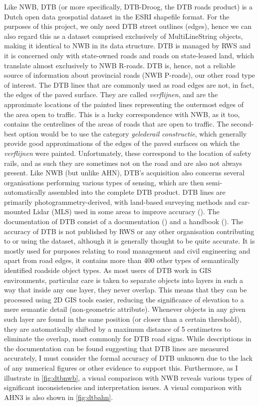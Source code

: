 Like NWB, DTB (or more specifically, DTB-Droog, the DTB roads product) is a Dutch open data geospatial dataset in the ESRI shapefile format. For the purposes of this project, we only need DTB street outlines (edges), hence we can also regard this as a dataset comprised exclusively of MultiLineString objects, making it identical to NWB in its data structure. DTB is managed by RWS and it is concerned only with state-owned roads and roads on state-leased land, which translate almost exclusively to NWB R-roads. DTB is, hence, not a reliable source of information about provincial roads (NWB P-roads), our other road type of interest. The DTB lines that are commonly used as road edges are not, in fact, the edges of the paved surface. They are called \textit{verflijnen}, and are the approximate locations of the painted lines representing the outermost edges of the area open to traffic. This is a lucky correspondence with NWB, as it too, contains the centrelines of the areas of roads that are open to traffic. The second-best option would be to use the category \textit{gelederail constructie}, which generally provide good approximations of the edges of the paved surfaces on which the \textit{verflijnen} were painted. Unfortunately, these correspond to the location of safety rails, and as such they are sometimes not on the road and are also not always present. Like NWB (but unlike AHN), DTB’s acquisition also concerns several organisations performing various types of sensing, which are then semi-automatically assembled into the complete DTB product. DTB lines are primarily photogrammetry-derived, with land-based surveying methods and car-mounted Lidar (MLS) used in some areas to improve accuracy (\cite{oudeElberink_vosselman_2012}). The documentation of DTB consist of a documentation (\cite{dtb_docs}) and a handbook (\cite{dtb_handbook}). The accuracy of DTB is not published by RWS or any other organisation contributing to or using the dataset, although it is generally thought to be quite accurate. It is mostly used for purposes relating to road management and civil engineering and apart from road edges, it contains more than 400 other types of semantically identified roadside object types. As most users of DTB work in GIS environments, particular care is taken to separate objects into layers in such a way that inside any one layer, they never overlap. This means that they can be processed using 2D GIS tools easier, reducing the significance of elevation to a mere semantic detail (non-geometric attribute). Whenever objects in any given such layer are found in the same position (or closer than a certain threshold), they are automatically shifted by a maximum distance of 5 centimetres to eliminate the overlap, most commonly for DTB road signs. While descriptions in the documentation can be found suggesting that DTB lines are measured accurately, I must consider the formal accuracy of DTB unknown due to the lack of any numerical figures or other evidence to support this. Furthermore, as I illustrate in \ref{fig:dtbnwb}, a visual comparison with NWB reveals various types of significant inconsistencies and interpretation issues. A visual comparison with AHN3 is also shown in \ref{fig:dtbahn}.

